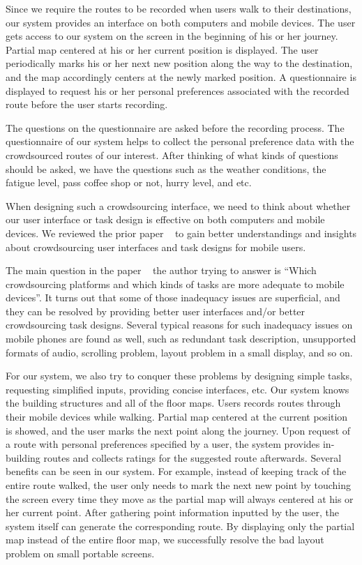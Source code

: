 \documentclass{sigchi}
\begin{document}
Since we require the routes to be recorded when users walk to their destinations, our system provides an interface on both computers and mobile devices. The user gets access to our system on the screen in the beginning of his or her journey. Partial map centered at his or her current position is displayed. The user periodically marks his or her next new position along the way to the destination, and the map accordingly centers at the newly marked position. A questionnaire is displayed to request his or her personal preferences associated with the recorded route before the user starts recording.


The questions on the questionnaire are asked before the recording process. The questionnaire of our system helps to collect the personal preference data with the crowdsourced routes of our interest. After thinking of what kinds of questions should be asked, we have the questions such as the weather conditions, the fatigue level, pass coffee shop or not, hurry level, and etc.


When designing such a crowdsourcing interface, we need to think about whether our user interface or task design is effective on both computers and mobile devices. We reviewed the prior paper ~\cite{della2013crowdsourcing} to gain better understandings and insights about crowdsourcing user interfaces and task designs for mobile users.


The main question in the paper ~\cite{della2013crowdsourcing} the author trying to answer is “Which crowdsourcing platforms and which kinds of tasks are more adequate to mobile devices”. It turns out that some of those inadequacy issues are superficial, and they can be resolved by providing better user interfaces and/or better crowdsourcing task designs. Several typical reasons for such inadequacy issues on mobile phones are found as well, such as redundant task description, unsupported formats of audio, scrolling problem, layout problem in a small display, and so on.  


For our system, we also try to conquer these problems by designing simple tasks, requesting simplified inputs, providing concise interfaces, etc. Our system knows the building structures and all of the floor maps. Users records routes through their mobile devices while walking. Partial map centered at the current position is showed, and the user marks the next point along the journey. Upon request of a route with personal preferences specified by a user, the system provides in-building routes and collects ratings for the suggested route afterwards. Several benefits can be seen in our system. For example, instead of keeping track of the entire route walked, the user only needs to mark the next new point by touching the screen every time they move as the partial map will always centered at his or her current point. After gathering point information inputted by the user, the system itself can generate the corresponding route. By displaying only the partial map instead of the entire floor map, we successfully resolve the bad layout problem on small portable screens.
\end{document}
